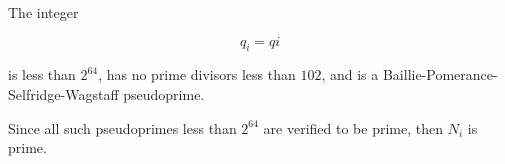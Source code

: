 \pagestyle{empty}
\phantom{a}
\vspace{2em}

\begin{center}
{\Huge {}}
\end{center}
\vspace{2em}

\noindent The integer

{\Huge\vspace{-1.8em}
$$
q_{ {{ i }} } = {{ qi }}
$$
}

\noindent is less than $2^{64}$, has no prime divisors less than $102$, and is a Baillie-Pomerance-Selfridge-Wagstaff pseudoprime.

\vspace{2em}
\noindent Since all such pseudoprimes less than $2^{64}$ are verified to be prime, then $N_i$ is prime.